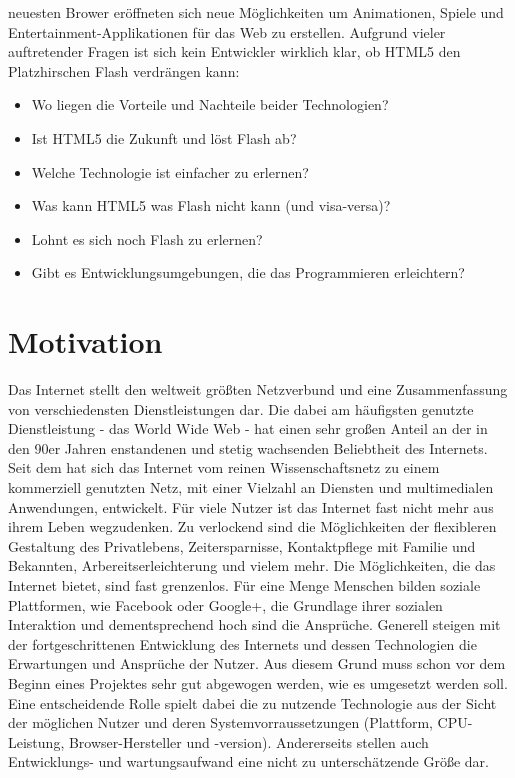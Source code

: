 neuesten Brower eröffneten sich neue Möglichkeiten um Animationen, Spiele und
Entertainment-Applikationen für das Web zu erstellen. Aufgrund vieler
auftretender Fragen ist sich kein Entwickler wirklich klar, ob HTML5 den
Platzhirschen Flash verdrängen kann:
\begin{itemize}
	\item Wo liegen die Vorteile und Nachteile beider Technologien?
	\item Ist HTML5 die Zukunft und löst Flash ab?
	\item Welche Technologie ist einfacher zu erlernen?
	\item Was kann HTML5 was Flash nicht kann (und visa-versa)?
	\item Lohnt es sich noch Flash zu erlernen?
	\item Gibt es Entwicklungsumgebungen, die das Programmieren erleichtern?
\end{itemize}
\section{Motivation}
Das Internet stellt den weltweit größten Netzverbund und eine Zusammenfassung
von verschiedensten Dienstleistungen dar. Die dabei am häufigsten genutzte
Dienstleistung - das World Wide Web - hat einen sehr großen Anteil an der in
den 90er Jahren enstandenen und stetig wachsenden Beliebtheit des Internets.
Seit dem hat sich das Internet vom reinen Wissenschaftsnetz zu einem
kommerziell genutzten Netz, mit einer Vielzahl an Diensten und multimedialen
Anwendungen, entwickelt.
\newline\newline
Für viele Nutzer ist das Internet fast nicht mehr aus ihrem Leben wegzudenken.
Zu verlockend sind die Möglichkeiten der flexibleren Gestaltung des
Privatlebens, Zeitersparnisse, Kontaktpflege mit Familie und Bekannten,
Arbereitserleichterung und vielem mehr. Die Möglichkeiten, die das Internet
bietet, sind fast grenzenlos.
\newline\newline
Für eine Menge Menschen bilden soziale Plattformen, wie Facebook oder Google+,
die Grundlage ihrer sozialen Interaktion und dementsprechend hoch sind die
Ansprüche. Generell steigen mit der fortgeschrittenen Entwicklung des
Internets und dessen Technologien die Erwartungen und Ansprüche der Nutzer.
\newline\newline
Aus diesem Grund muss schon vor dem Beginn eines Projektes sehr gut
abgewogen werden, wie es umgesetzt werden soll.
Eine entscheidende Rolle spielt dabei die zu nutzende Technologie aus der
Sicht der möglichen Nutzer und deren Systemvorraussetzungen (Plattform, CPU-
Leistung, Browser-Hersteller und -version). Andererseits stellen auch
Entwicklungs- und wartungsaufwand eine nicht zu unterschätzende Größe dar.

